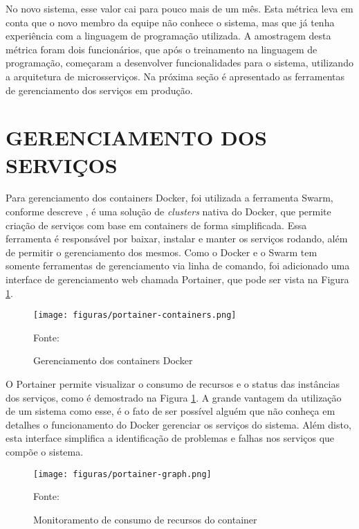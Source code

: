 No novo sistema, esse valor cai para pouco mais de um mês. Esta métrica
leva em conta que o novo membro da equipe não conhece o sistema, mas que
já tenha experiência com a linguagem de programação utilizada. A amostragem
desta métrica foram dois funcionários, que após o treinamento na linguagem
de programação, começaram a desenvolver funcionalidades para o sistema,
utilizando a arquitetura de microsserviços. Na próxima seção é apresentado
as ferramentas de gerenciamento dos serviços em produção.

\section{GERENCIAMENTO DOS SERVIÇOS}

Para gerenciamento dos containers Docker, foi utilizada a ferramenta Swarm,
conforme descreve , é uma solução de \emph{clusters}
nativa do Docker, que permite criação de serviços com base em containers de
forma simplificada. Essa ferramenta é responsável por baixar, instalar e
manter os serviços rodando, além de permitir o gerenciamento dos mesmos.
Como o Docker e o Swarm tem somente ferramentas de gerenciamento via linha de
comando, foi adicionado uma interface de gerenciamento web chamada Portainer,
que pode ser vista na Figura \ref{fig:portainer-containers}.

\begin{figure}[H]
	\centering
    \caption{Gerenciamento dos containers Docker}
	\texttt{[image: figuras/portainer-containers.png]}

	\label{fig:portainer-containers}
	\footnotesize Fonte: \fonteOAutor
\end{figure}

O Portainer permite visualizar o consumo de recursos e o status das instâncias
dos serviços, como é demostrado na Figura \ref{fig:portainer-containers}.
A grande vantagem da utilização de um sistema como esse, é o fato de ser
possível alguém que não conheça em detalhes o funcionamento do Docker gerenciar
os serviços do sistema. Além disto, esta interface simplifica a identificação
de problemas e falhas nos serviços que compõe o sistema.

\begin{figure}[H]
	\centering
    \caption{Monitoramento de consumo de recursos do container}
	\texttt{[image: figuras/portainer-graph.png]}

	\label{fig:portainer-graph}
	\footnotesize Fonte: \fonteOAutor
\end{figure}

